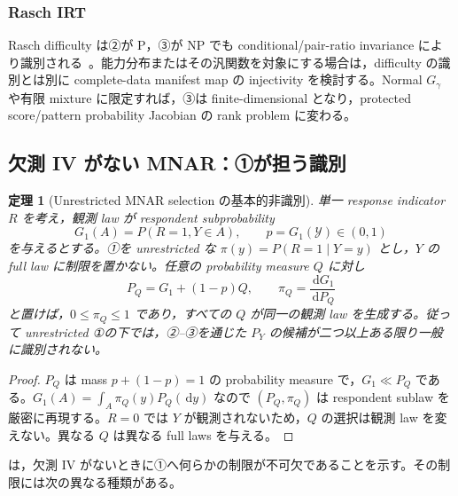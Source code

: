 \documentclass[11pt,a4paper]{ltjsarticle}
\newtheorem{theorem}{定理}[section]
\theoremstyle{remark}
\newcommand{\dd}{\,\mathrm d}
\newcommand{\cY}{\mathcal Y}
\begin{document}
\subsubsection{Rasch IRT}
Rasch difficulty は②が P，③が NP でも conditional/pair-ratio invariance により識別される~\cite{Rasch1960,Andersen1970,Follmann1988}。能力分布またはその汎関数を対象にする場合は，difficulty の識別とは別に complete-data manifest map の injectivity を検討する。Normal $G_\gamma$ や有限 mixture に限定すれば，③は finite-dimensional となり，protected score/pattern probability Jacobian の rank problem に変わる。

\subsection{欠測 IV がない MNAR：①が担う識別}

\begin{theorem}[Unrestricted MNAR selection の基本的非識別]
\label{thm:noivunrestrictednonid}
単一 response indicator $R$ を考え，観測 law が respondent subprobability
\[
 G_1(A)=P(R=1,Y\in A),\qquad p=G_1(\cY)\in(0,1)
\]
を与えるとする。①を unrestricted な $\pi(y)=P(R=1\mid Y=y)$ とし，$Y$ の full law に制限を置かない。任意の probability measure $Q$ に対し
\begin{equation}
 P_Q=G_1+(1-p)Q,
 \qquad
 \pi_Q=\frac{\dd G_1}{\dd P_Q}
\label{eq:noivconstruction}
\end{equation}
と置けば，$0\le\pi_Q\le1$ であり，すべての $Q$ が同一の観測 law を生成する。従って unrestricted ①の下では，②--③を通じた $P_Y$ の候補が二つ以上ある限り一般に識別されない。
\end{theorem}

\begin{proof}
$P_Q$ は mass $p+(1-p)=1$ の probability measure で，$G_1\ll P_Q$ である。$G_1(A)=\int_A\pi_Q(y)P_Q(\dd y)$ なので $(P_Q,\pi_Q)$ は respondent sublaw を厳密に再現する。$R=0$ では $Y$ が観測されないため，$Q$ の選択は観測 law を変えない。異なる $Q$ は異なる full laws を与える。
\end{proof}

 は，欠測 IV がないときに①へ何らかの制限が不可欠であることを示す。その制限には次の異なる種類がある。
\end{document}
